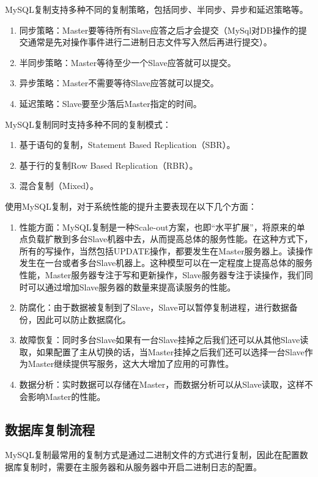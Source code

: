 MySQL复制支持多种不同的复制策略，包括同步、半同步、异步和延迟策略等。
\begin{enumerate}
\item 同步策略：Master要等待所有Slave应答之后才会提交（MySql对DB操作的提交通常是先对操作事件进行二进制日志文件写入然后再进行提交）。
\item 半同步策略：Master等待至少一个Slave应答就可以提交。
\item 异步策略：Master不需要等待Slave应答就可以提交。
\item 延迟策略：Slave要至少落后Master指定的时间。
\end{enumerate}
MySQL复制同时支持多种不同的复制模式：
\begin{enumerate}
\item 基于语句的复制，Statement Based Replication（SBR）。
\item 基于行的复制Row Based Replication（RBR）。
\item 混合复制（Mixed）。
\end{enumerate}
使用MySQL复制，对于系统性能的提升主要表现在以下几个方面：
\begin{enumerate}
\item 性能方面：MySQL复制是一种Scale-out方案，也即“水平扩展”，将原来的单点负载扩散到多台Slave机器中去，从而提高总体的服务性能。在这种方式下，所有的写操作，当然包括UPDATE操作，都要发生在Master服务器上。读操作发生在一台或者多台Slave机器上。这种模型可以在一定程度上提高总体的服务性能，Master服务器专注于写和更新操作，Slave服务器专注于读操作，我们同时可以通过增加Slave服务器的数量来提高读服务的性能。

\item 防腐化：由于数据被复制到了Slave，Slave可以暂停复制进程，进行数据备份，因此可以防止数据腐化。

\item 故障恢复：同时多台Slave如果有一台Slave挂掉之后我们还可以从其他Slave读取，如果配置了主从切换的话，当Master挂掉之后我们还可以选择一台Slave作为Master继续提供写服务，这大大增加了应用的可靠性。

\item 数据分析：实时数据可以存储在Master，而数据分析可以从Slave读取，这样不会影响Master的性能。
\end{enumerate}
\subsection{数据库复制流程}
MySQL复制最常用的复制方式是通过二进制文件的方式进行复制，因此在配置数据库复制时，需要在主服务器和从服务器中开启二进制日志的配置。

